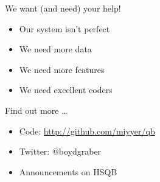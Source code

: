 \documentclass[compress]{beamer}
\begin{document}
\begin{frame}{We want (and need) your help!}

	\begin{itemize}
		\item Our system isn't perfect
		\item We need more data
		\item We need more features
		\item We need excellent coders	
	\end{itemize}
	
	\pause

	\begin{block}{Find out more \dots}
		\begin{itemize}
			\item Code: \url{http://github.com/miyyer/qb}
			\item Twitter: @boydgraber
			\item Announcements on HSQB
		\end{itemize}
	\end{block}

\end{frame}
\end{document}
